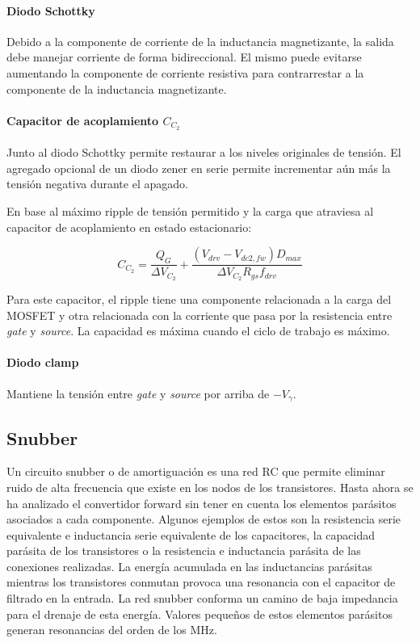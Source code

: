 \paragraph{Diodo Schottky}

Debido a la componente de corriente de la inductancia magnetizante, la salida debe manejar corriente de forma bidireccional. 
El mismo puede evitarse aumentando la componente de corriente resistiva para contrarrestar a la componente de la inductancia magnetizante. 

\paragraph{Capacitor de acoplamiento $C_{C_2}$}

Junto al diodo Schottky permite restaurar a los niveles originales de tensión. 
El agregado opcional de un diodo zener en serie permite incrementar aún más la tensión negativa durante el apagado. 

En base al máximo ripple de tensión permitido y la carga que atraviesa al capacitor de acoplamiento en estado estacionario:

$$ C_{C_2}=\frac{Q_G}{\Delta V_{C_2}}+\frac{(V_{drv}-V_{dc2,fw})D_{max}}{\Delta V_{C_2}R_{gs}f_{drv}} $$

Para este capacitor, el ripple tiene una componente relacionada a la carga del MOSFET 
y otra relacionada con la corriente que pasa por la resistencia entre \textit{gate} y \textit{source}. 
La capacidad es máxima cuando el ciclo de trabajo es máximo. 

\paragraph{Diodo clamp}

Mantiene la tensión entre \textit{gate} y \textit{source} por arriba de $-V_\gamma$.\\

\subsection{Snubber} \label{subsec:oscilaciones}

Un circuito snubber o de amortiguación es una red RC que permite eliminar ruido de alta frecuencia que existe en los nodos de los transistores.
Hasta ahora se ha analizado el convertidor forward sin tener en cuenta los elementos parásitos asociados a cada componente. 
Algunos ejemplos de estos son la resistencia serie equivalente e inductancia serie equivalente de los capacitores, 
la capacidad parásita de los transistores o la resistencia e inductancia parásita de las conexiones realizadas. 
La energía acumulada en las inductancias parásitas mientras los transistores conmutan provoca una resonancia con el capacitor de filtrado en la entrada. 
La red snubber conforma un camino de baja impedancia para el drenaje de esta energía. 
Valores pequeños de estos elementos parásitos generan resonancias del orden de los MHz. 


